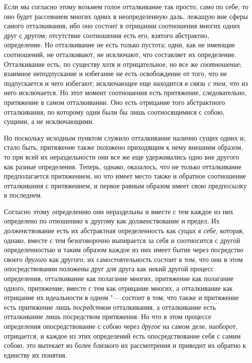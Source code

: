 Если мы согласно этому возьмем голое отталкивание так просто, само по себе,
то оно будет рассеянием многих одних в неопределенную даль, лежащую вне
сферы самого отталкивания, ибо оно состоит в отрицании соотношения многих
одних друг с другом; отсутствие соотношения есть его, взятого абстрактно,
определение. Но отталкивание не есть только пустота; одни, как не имеющие
соотношений, не отталкивают, не исключают, что составляет их определение.
Отталкивание есть, по существу хотя и отрицательное, но все же
{\em соотношение}; взаимное неподпускание и избегание
не есть освобождение от того, что не подпускается и чего избегают;
исключающее еще находится {\em в связи с тем}, что из
него исключается. Но этот момент соотношения есть притяжение,
следовательно, притяжение в самом отталкивании. Оно есть отрицание того
абстрактного отталкивания, по которому одни были бы лишь соотносящимися с
собою, сущими, а не исключающими.

Но поскольку исходным пунктом служило отталкивание налично сущих одних и,
стало быть, притяжение также положено приходящим к нему внешним образом, то
при всей их нераздельности они все же еще удерживались одно вне другого как
разные определения. Теперь, однако, оказалось, что не только отталкивание
предполагается притяжением, но что имеет место также и обратное соотношение
отталкивания с притяжением, и первое равным образом имеет свою предпосылку
в последнем.

Согласно этому определению они нераздельны и вместе с тем каждое из них
определено по отношению к другому как долженствование и предел. Их
долженствование есть их абстрактная определенность как
{\em сущих в себе}, которая, однако, вместе с тем
безоговорочно выпирается за себя и соотносится с другой определенностью и
таким образом каждое из них имеет бытие через посредство своего
{\em другого} как другого; их самостоятельность состоит
в том, что они в этом опосредствовании положены друг для друга как некий
другой процесс определения, отталкивание как полагание многих, притяжение
как полагание одного, притяжение, вместе с тем как отрицание многих, а
отталкивание как отрицание их идеальности в одном "--- состоит в том, что
также и притяжение есть притяжение лишь
{\em посредством} отталкивания, а отталкивание есть
отталкивание лишь посредством притяжения. Но что в этом процессе
определения опосредствование с собою через {\em другое}
на самом деле, наоборот, отрицается, и каждое из этих определений есть
опосредствование себя с самим собою, это вытекает из более близкого их
рассмотрения и приводит их обратно к единству их понятия.

